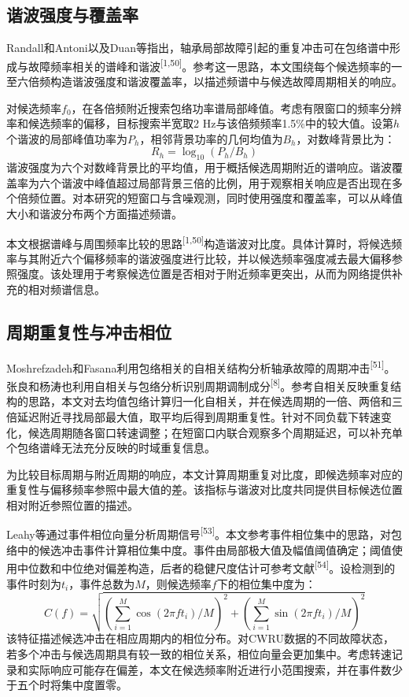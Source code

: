 \documentclass[UTF8,12pt,openany,twoside]{ctexbook}
\numberwithin{equation}{chapter}
\begin{document}
\subsection{谐波强度与覆盖率}\label{ux8c10ux6ce2ux5f3aux5ea6ux4e0eux8986ux76d6ux7387}


Randall和Antoni以及Duan等指出，轴承局部故障引起的重复冲击可在包络谱中形成与故障频率相关的谱峰和谐波\textsuperscript{[1,50]}。参考这一思路，本文围绕每个候选频率的一至六倍频构造谐波强度和谐波覆盖率，以描述频谱中与候选故障周期相关的响应。

对候选频率$f_0$，在各倍频附近搜索包络功率谱局部峰值。考虑有限窗口的频率分辨率和候选频率的偏移，目标搜索半宽取2 Hz与该倍频频率1.5\%中的较大值。设第$h$个谐波的局部峰值功率为$P_h$，相邻背景功率的几何均值为$B_h$，对数峰背景比为：
\begin{equation}
\label{eq:auto05}
R_h=\log_{10}(P_h/B_h)
\end{equation}
谐波强度为六个对数峰背景比的平均值，用于概括候选周期附近的谱响应。谐波覆盖率为六个谐波中峰值超过局部背景三倍的比例，用于观察相关响应是否出现在多个倍频位置。对本研究的短窗口与含噪观测，同时使用强度和覆盖率，可以从峰值大小和谐波分布两个方面描述频谱。

本文根据谱峰与周围频率比较的思路\textsuperscript{[1,50]}构造谐波对比度。具体计算时，将候选频率与其附近六个偏移频率的谐波强度进行比较，并以候选频率强度减去最大偏移参照强度。该处理用于考察候选位置是否相对于附近频率更突出，从而为网络提供补充的相对频谱信息。

\subsection{周期重复性与冲击相位}\label{ux5468ux671fux91cdux590dux6027ux4e0eux51b2ux51fbux76f8ux4f4d}


Moshrefzadeh和Fasana利用包络相关的自相关结构分析轴承故障的周期冲击\textsuperscript{[51]}。 张良和杨涛也利用自相关与包络分析识别周期调制成分\textsuperscript{[8]}。参考自相关反映重复结构的思路，本文对去均值包络计算归一化自相关，并在候选周期的一倍、两倍和三倍延迟附近寻找局部最大值，取平均后得到周期重复性。针对不同负载下转速变化，候选周期随各窗口转速调整；在短窗口内联合观察多个周期延迟，可以补充单个包络谱峰无法充分反映的时域重复信息。

为比较目标周期与附近周期的响应，本文计算周期重复对比度，即候选频率对应的重复性与偏移频率参照中最大值的差。该指标与谐波对比度共同提供目标候选位置相对附近参照位置的描述。

Leahy等通过事件相位向量分析周期信号\textsuperscript{[53]}。本文参考事件相位集中的思路，对包络中的候选冲击事件计算相位集中度。事件由局部极大值及幅值阈值确定；阈值使用中位数和中位绝对偏差构造，后者的稳健尺度估计可参考文献\textsuperscript{[54]}。设检测到的事件时刻为$t_i$，事件总数为$M$，则候选频率$f$下的相位集中度为：
\begin{equation}
\label{eq:auto06}
C(f)=\sqrt{\left(\sum_{i=1}^{M}\cos(2\pi ft_i)/M\right)^2+\left(\sum_{i=1}^{M}\sin(2\pi ft_i)/M\right)^2}
\end{equation}
该特征描述候选冲击在相应周期内的相位分布。对CWRU数据的不同故障状态，若多个冲击与候选周期具有较一致的相位关系，相位向量会更加集中。考虑转速记录和实际响应可能存在偏差，本文在候选频率附近进行小范围搜索，并在事件数少于五个时将集中度置零。
\end{document}
